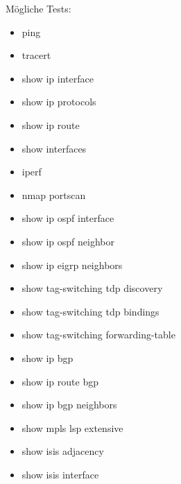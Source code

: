 \documentclass[
	ngerman,
	toc=listof, %
	toc=bibliography, %
	footnotes=multiple, %
	parskip=half, %
	numbers=noendperiod %
]{scrartcl}
\begin{document}
	Mögliche Tests:
	\begin{itemize}
		\item ping
		\item tracert
		\item show ip interface 
		\item show ip protocols
		\item show ip route
		\item show interfaces
		\item iperf
		\item nmap portscan
		\item show ip ospf interface
		\item show ip ospf neighbor
		\item show ip eigrp neighbors
		\item show tag-switching tdp discovery
		\item show tag-switching tdp bindings
		\item show tag-switching forwarding-table
		\item show ip bgp 
		\item show ip route bgp 
		\item show ip bgp neighbors
		\item show mpls lsp extensive
		\item show isis adjacency
		\item show isis interface
	\end{itemize}
\end{document}

